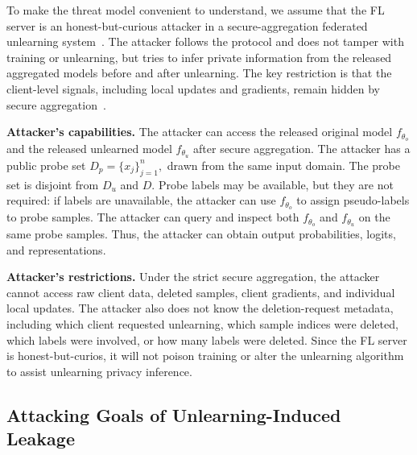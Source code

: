 To make the threat model convenient to understand, we assume that the FL server is an honest-but-curious attacker in a secure-aggregation federated unlearning system~\citep{kairouz2021advances}. The attacker follows the protocol and does not tamper with training or unlearning, but tries to infer private information from the released aggregated models before and after unlearning. The key restriction is that the client-level signals, including local updates and gradients, remain hidden by secure aggregation~\citep{bonawitz2017practical}.




\noindent
\textbf{Attacker's capabilities.}
The attacker can access the released original model $f_{\theta_o}$ and the released unlearned model $f_{\theta_u}$ after secure aggregation. The attacker has a public probe set $D_p=\{x_j\}_{j=1}^{n},$ drawn from the same input domain. The probe set is disjoint from $D_u$ and $D$. Probe labels may be available, but they are not required: if labels are unavailable, the attacker can use $f_{\theta_o}$ to assign pseudo-labels to probe samples. The attacker can query and inspect both $f_{\theta_o}$ and $f_{\theta_u}$ on the same probe samples. Thus, the attacker can obtain output probabilities, logits, and representations. 

\noindent
\textbf{Attacker's restrictions.}
Under the strict secure aggregation, the attacker cannot access raw client data, deleted samples, client gradients, and individual local updates. The attacker also does not know the deletion-request metadata, including which client requested unlearning, which sample indices were deleted, which labels were involved, or how many labels were deleted. Since the FL server is honest-but-curios, it will not poison training or alter the unlearning algorithm to assist unlearning privacy inference.



\subsection{Attacking Goals of Unlearning-Induced Leakage}

